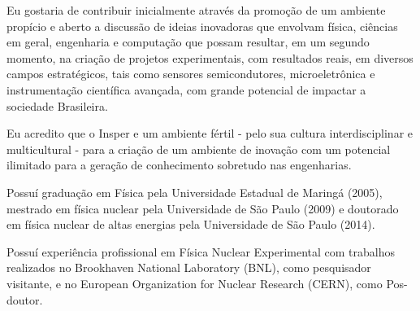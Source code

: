 

Eu gostaria de contribuir inicialmente através da promoção de um ambiente propício e aberto a discussão de ideias inovadoras que envolvam física, ciências em geral, engenharia e computação que possam resultar, em um segundo momento, na criação de projetos experimentais, com resultados reais, em diversos campos estratégicos, tais como sensores semicondutores, microeletrônica e instrumentação científica avançada, com grande potencial de impactar a sociedade Brasileira.

Eu acredito que o Insper e um ambiente fértil - pelo sua cultura interdisciplinar e multicultural - para a criação de um ambiente de inovação com um potencial ilimitado para a geração de conhecimento sobretudo nas engenharias.


Possuí graduação em Física pela Universidade Estadual de Maringá (2005), mestrado em física nuclear pela Universidade de São Paulo (2009) e doutorado em física nuclear de altas energias pela Universidade de São Paulo (2014). 

Possuí experiência profissional em Física Nuclear Experimental com trabalhos realizados no Brookhaven National Laboratory (BNL), como pesquisador visitante, e no European Organization for Nuclear Research (CERN), como Pos- doutor.